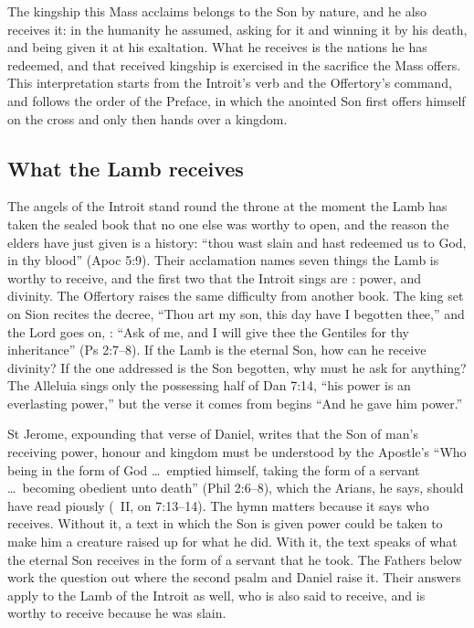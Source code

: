 
The kingship this Mass acclaims belongs to the Son by nature, and he also
receives it: in the humanity he assumed, asking for it and winning it by his
death, and being given it at his exaltation. What he receives is the nations he
has redeemed, and that received kingship is exercised in the sacrifice the Mass
offers. This interpretation starts from the Introit's verb and the Offertory's
command, and follows the order of the Preface, in which the anointed Son first
offers himself on the cross and only then hands over a kingdom.

\subsection{What the Lamb receives}
\label{sec:lamb-question}

The angels of the Introit stand round the throne at the moment the Lamb has
taken the sealed book that no one else was worthy to open, and the reason the
elders have just given is a history: ``thou wast slain and hast redeemed us to
God, in thy blood'' (Apoc 5:9). Their acclamation names seven things the Lamb
is worthy to receive, and the first two that the Introit sings are
: power, and divinity. The Offertory raises the
same difficulty from another book. The king set on Sion recites the decree,
``Thou art my son, this day have I begotten thee,'' and the Lord goes on,
: ``Ask of me, and I
will give thee the Gentiles for thy inheritance'' (Ps 2:7--8). If the Lamb is
the eternal Son, how can he receive divinity? If the one addressed is the Son
begotten, why must he ask for anything? The Alleluia sings only the possessing
half of Dan 7:14, ``his power is an everlasting power,'' but the verse it comes
from begins ``And he gave him power.''

St Jerome, expounding that verse of Daniel, writes that the Son of man's
receiving power, honour and kingdom must be understood by the Apostle's ``Who
being in the form of God \dots\ emptied himself, taking the form of a servant
\dots\ becoming obedient unto death'' (Phil 2:6--8), which the Arians, he
says, should have read piously (\ II, on 7:13--14). The hymn
matters because it says who receives. Without it, a text in which the Son is
given power could be taken to make him a creature raised up for what he did.
With it, the text speaks of what the eternal Son receives in the form of a
servant that he took. The Fathers below work the
question out where the second psalm and Daniel raise it. Their answers apply
to the Lamb of the Introit as well, who is also said to receive, and is worthy
to receive because he was slain.

